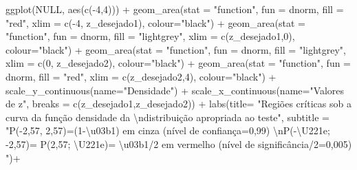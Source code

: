 \documentclass[
]{book}
\newenvironment{Shaded}{\begin{snugshade}}{\end{snugshade}}
\newcommand{\AttributeTok}[1]{\textcolor[rgb]{0.77,0.63,0.00}{#1}}
\newcommand{\ConstantTok}[1]{\textcolor[rgb]{0.00,0.00,0.00}{#1}}
\newcommand{\DecValTok}[1]{\textcolor[rgb]{0.00,0.00,0.81}{#1}}
\newcommand{\FunctionTok}[1]{\textcolor[rgb]{0.00,0.00,0.00}{#1}}
\newcommand{\NormalTok}[1]{#1}
\newcommand{\SpecialCharTok}[1]{\textcolor[rgb]{0.00,0.00,0.00}{#1}}
\newcommand{\StringTok}[1]{\textcolor[rgb]{0.31,0.60,0.02}{#1}}
\begin{document}
\begin{Shaded}
\begin{Highlighting}[]
\FunctionTok{ggplot}\NormalTok{(}\ConstantTok{NULL}\NormalTok{, }\FunctionTok{aes}\NormalTok{(}\FunctionTok{c}\NormalTok{(}\SpecialCharTok{{-}}\DecValTok{4}\NormalTok{,}\DecValTok{4}\NormalTok{))) }\SpecialCharTok{+}
  \FunctionTok{geom\_area}\NormalTok{(}\AttributeTok{stat =} \StringTok{"function"}\NormalTok{, }
            \AttributeTok{fun =}\NormalTok{ dnorm, }
            \AttributeTok{fill =} \StringTok{"red"}\NormalTok{, }
            \AttributeTok{xlim =} \FunctionTok{c}\NormalTok{(}\SpecialCharTok{{-}}\DecValTok{4}\NormalTok{, z\_desejado1),}
            \AttributeTok{colour=}\StringTok{"black"}\NormalTok{) }\SpecialCharTok{+}
  \FunctionTok{geom\_area}\NormalTok{(}\AttributeTok{stat =} \StringTok{"function"}\NormalTok{, }
            \AttributeTok{fun =}\NormalTok{ dnorm, }
            \AttributeTok{fill =} \StringTok{"lightgrey"}\NormalTok{, }
            \AttributeTok{xlim =} \FunctionTok{c}\NormalTok{(z\_desejado1,}\DecValTok{0}\NormalTok{),}
            \AttributeTok{colour=}\StringTok{"black"}\NormalTok{) }\SpecialCharTok{+}
  \FunctionTok{geom\_area}\NormalTok{(}\AttributeTok{stat =} \StringTok{"function"}\NormalTok{, }
            \AttributeTok{fun =}\NormalTok{ dnorm, }
            \AttributeTok{fill =} \StringTok{"lightgrey"}\NormalTok{, }
            \AttributeTok{xlim =} \FunctionTok{c}\NormalTok{(}\DecValTok{0}\NormalTok{, z\_desejado2),}
            \AttributeTok{colour=}\StringTok{"black"}\NormalTok{) }\SpecialCharTok{+}
  \FunctionTok{geom\_area}\NormalTok{(}\AttributeTok{stat =} \StringTok{"function"}\NormalTok{, }
            \AttributeTok{fun =}\NormalTok{ dnorm, }
            \AttributeTok{fill =} \StringTok{"red"}\NormalTok{, }
            \AttributeTok{xlim =} \FunctionTok{c}\NormalTok{(z\_desejado2,}\DecValTok{4}\NormalTok{),}
            \AttributeTok{colour=}\StringTok{"black"}\NormalTok{) }\SpecialCharTok{+}
  \FunctionTok{scale\_y\_continuous}\NormalTok{(}\AttributeTok{name=}\StringTok{"Densidade"}\NormalTok{) }\SpecialCharTok{+}
  \FunctionTok{scale\_x\_continuous}\NormalTok{(}\AttributeTok{name=}\StringTok{"Valores de z"}\NormalTok{, }\AttributeTok{breaks =} \FunctionTok{c}\NormalTok{(z\_desejado1,z\_desejado2))  }\SpecialCharTok{+}
  \FunctionTok{labs}\NormalTok{(}\AttributeTok{title=} 
         \StringTok{"Regiões críticas sob a curva da função densidade da }\SpecialCharTok{\textbackslash{}n}\StringTok{distribuição apropriada ao teste"}\NormalTok{, }
       \AttributeTok{subtitle =} \StringTok{"P({-}2,57, 2,57)=(1{-}\textbackslash{}u03b1) em cinza (nível de confiança=0,99) }\SpecialCharTok{\textbackslash{}n}\StringTok{P({-}\textbackslash{}U221e; {-}2,57)= P(2,57; \textbackslash{}U221e)= \textbackslash{}u03b1/2 em vermelho (nível de significância/2=0,005) "}\NormalTok{)}\SpecialCharTok{+}

\end{Highlighting}
\end{Shaded}
\end{document}

